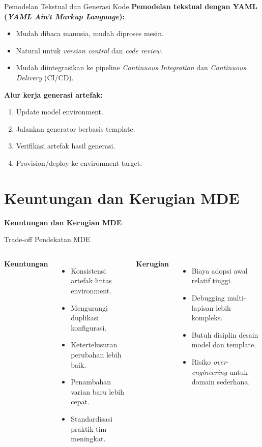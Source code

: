 \documentclass[aspectratio=169, table]{beamer}
\begin{document}
\begin{frame}{Pemodelan Tekstual dan Generasi Kode}
\vspace{8pt}
\textbf{Pemodelan tekstual dengan YAML (\textit{YAML Ain't Markup Language}):}
\begin{itemize}
  \item Mudah dibaca manusia, mudah diproses mesin.
  \item Natural untuk \textit{version control} dan \textit{code review}.
  \item Mudah diintegrasikan ke pipeline \textit{Continuous Integration} dan \textit{Continuous Delivery} (CI/CD).
\end{itemize}

\vspace{6pt}
\textbf{Alur kerja generasi artefak:}
\begin{enumerate}
  \item Update model environment.
  \item Jalankan generator berbasis template.
  \item Verifikasi artefak hasil generasi.
  \item Provision/deploy ke environment target.
\end{enumerate}
\end{frame}

\section{Keuntungan dan Kerugian MDE}
\begin{frame}{\hfill}
	\centering
	\Huge{\textbf{Keuntungan dan Kerugian MDE}}
\end{frame}

\begin{frame}{Trade-off Pendekatan MDE}
\vspace{8pt}
\begin{columns}[T]
\textbf{Keuntungan}
\begin{itemize}
  \item Konsistensi artefak lintas environment.
  \item Mengurangi duplikasi konfigurasi.
  \item Ketertelusuran perubahan lebih baik.
  \item Penambahan varian baru lebih cepat.
  \item Standardisasi praktik tim meningkat.
\end{itemize}

\textbf{Kerugian}
\begin{itemize}
  \item Biaya adopsi awal relatif tinggi.
  \item Debugging multi-lapisan lebih kompleks.
  \item Butuh disiplin desain model dan template.
  \item Risiko \textit{over-engineering} untuk domain sederhana.
\end{itemize}
\end{columns}
\end{frame}
\end{document}
